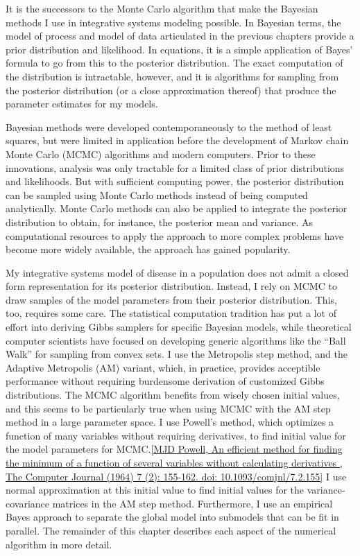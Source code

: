 It is the successors to the Monte Carlo algorithm that make the
Bayesian methods I use in integrative systems modeling possible.  In
Bayesian terms, the model of process and model of data articulated in
the previous chapters provide a prior distribution and
likelihood.  In equations, it is a simple application of Bayes'
formula to go from this to the posterior distribution.  The exact
computation of the distribution is intractable, however, and it is
algorithms for sampling from the posterior distribution (or a close
approximation thereof) that produce the parameter estimates for my
models.

Bayesian methods were developed contemporaneously to the method of
least squares, but were limited in application before the development
of Markov chain Monte Carlo (MCMC) algorithms and modern computers.
Prior to these innovations, analysis was only tractable for a limited
class of prior distributions and likelihoods. But with sufficient
computing power, the posterior distribution can be sampled using Monte
Carlo methods instead of being computed
analytically.\cite{Gelman_Bayesian_2003} Monte Carlo methods can also
be applied to integrate the posterior distribution to obtain, for
instance, the posterior mean and variance. As computational resources
to apply the approach to more complex problems have become more widely
available, the approach has gained popularity.\cite{Tanner_From_2010}

My integrative systems model of disease in a population does not admit
a closed form representation for its posterior distribution.  Instead,
I rely on MCMC to draw samples of the model parameters from their
posterior distribution.  This, too, requires some care.  The
statistical computation tradition has put a lot of effort into
deriving Gibbs samplers for specific Bayesian models, while
theoretical computer scientists have focused on developing generic
algorithms like the ``Ball Walk'' for sampling from convex sets.  I
use the Metropolis step method, and the Adaptive Metropolis (AM)
variant,\cite{Haario_Adaptive_2001} which, in practice, provides
acceptible performance without requiring burdensome derivation of
customized Gibbs distributions. The MCMC algorithm benefits from
wisely chosen initial values, and this seems to be particularly true
when using MCMC with the AM step method in a large parameter space. I
use Powell's method, which optimizes a function of many variables
without requiring derivatives, to find initial value for the model
parameters for MCMC.\ref{MJD Powell, An efficient method for finding
  the minimum of a function of several variables without calculating
  derivatives , The Computer Journal (1964) 7 (2): 155-162.  doi:
  10.1093/comjnl/7.2.155}  I use normal approximation at this initial
value to find initial values for the variance-covariance matrices in
the AM step method.  Furthermore, I use an empirical Bayes
approach to separate the global model into submodels that can be fit
in parallel.  The remainder of this chapter describes each aspect of
the numerical algorithm in more detail.

